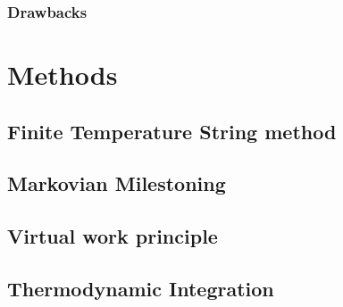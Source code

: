 \documentclass{article}
\begin{document}
\subsubsection{Drawbacks}

\section{Methods}

\subsection{Finite Temperature String method}

\subsection{Markovian Milestoning}

\subsection{Virtual work principle}

\subsection{Thermodynamic Integration}

\newpage

 

\end{document}
